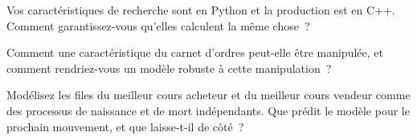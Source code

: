 \begin{interviewq}\label{iq:rs:order-book-features:4}
Vos caractéristiques de recherche sont en Python et la production est en C++. Comment garantissez-vous qu'elles calculent la même chose~?
\end{interviewq}

\begin{interviewq}\label{iq:rs:order-book-features:5}
Comment une caractéristique du carnet d'ordres peut-elle être manipulée, et comment rendriez-vous un modèle robuste à cette manipulation~?
\end{interviewq}

\begin{interviewq}\label{iq:rs:order-book-features:6}
Modélisez les files du meilleur cours acheteur et du meilleur cours vendeur comme des processus de naissance et de mort indépendants. Que prédit le modèle pour le prochain mouvement, et que
laisse-t-il de côté~?
\end{interviewq}
